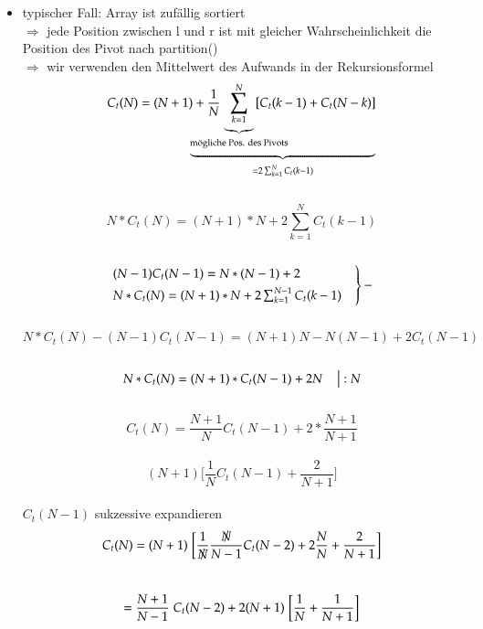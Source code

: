 \documentclass[11pt, fleqn]{scrreprt}
\begin{document}
\begin{itemize}
        \item typischer Fall: Array ist zufällig sortiert \\
        $\Rightarrow$ jede Position zwischen l und r ist mit gleicher Wahrscheinlichkeit die Position des Pivot nach partition() \\
        $\Rightarrow$ wir verwenden den Mittelwert des Aufwands in der Rekursionsformel \\
        \[C_t(N) = (N+1) + \frac{1}{N}  \hspace*{-9mm} \underbrace{\underbrace{\sum_{k=1}^N}_{\text{mögliche Pos. des Pivots}}\hspace*{-9mm} [C_t(k-1) + C_t(N-k)]}_{= 2 \sum_{k=1}^N C_t(k-1)} \]\\
        \vspace*{-6mm}
        \[N * C_t(N) = (N+1) * N + 2 \sum_{k=1}^N C_t(k-1)\] \\
        \vspace*{-6mm}
        \[ \begin{rcases}(N-1) C_t(N-1) = N*(N-1) + 2 & \\
         N * C_t(N) = (N+1) * N + 2 \sum_{k=1}^{N-1} C_t(k-1) & \end{rcases} - \]\\
         \vspace*{-6mm}
        \[N* C_t(N) - (N-1) C_t(N-1) = (N+1)N - N(N-1) + 2 C_t(N-1) \] \\
        \vspace*{-9mm}
        \[ N * C_t(N) = (N+1) * C_t(N-1) + 2N \hspace*{4mm} \big| :N\] \\
        \vspace*{-9mm}
        \[ C_t(N) = \frac{N+1}{N} C_t(N-1) + 2* \frac{N+1}{N+1} \] \\
        \vspace*{-9mm}
        \[ (N+1) \biggl\lbrack \frac{1}{N} C_t(N-1) + \frac{2}{N+1}\biggr\rbrack \] \\
        $ C_t(N-1)$ sukzessive expandieren \\
        \vspace*{-3mm}
        \[ C_t(N) = (N+1) \hspace*{1mm}  \biggl\lbrack \frac{1}{\slashed{N}} \frac{\slashed{N}}{N-1} C_t(N-2) + 2 \frac{N}{N} + \frac{2}{N+1}\biggr\rbrack\] \\
        \vspace*{-9mm}
        \[ = \frac{N+1}{N-1} \hspace*{1mm} C_t(N-2) + 2(N+1) \hspace*{1mm} \biggl\lbrack\frac{1}{N}+\frac{1}{N+1}\biggr\rbrack \]\\

\end{itemize}
\end{document}
